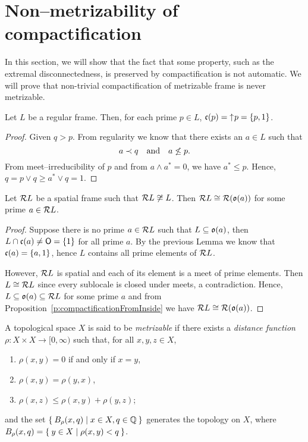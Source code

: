 \section{Non--metrizability of compactification}

In this section, we will show that the fact that some property, such as the extremal disconnectedness, is preserved by compactification is not automatic.
We will prove that non-trivial compactification of metrizable frame is never metrizable.

\begin{lemma}
    Let $L$ be a regular frame. Then, for each prime $p\in L$, $\mathfrak{c}(p) = \mathord{\uparrow}\mkern1mu p = \{p,1\}$.
\end{lemma}
\begin{proof}
    Given $q > p$. From regularity we know that there exists an $a\in L$ such that
    $$ a\prec q\quad\text{and}\quad a\not\leq p. $$
    From meet--irreducibility of $p$ and from $a\wedge a^* = 0$, we have $a^*\leq p$. Hence, $q = p\vee q \geq a^*\vee q = 1$.
\end{proof}

\begin{proposition}\label{p:spatialCompactifAndPrime}
    Let $\mathcal{R} L$ be a spatial frame such that $\mathcal{R} L\not\cong L$. Then $\mathcal{R} L\cong \mathcal{R}(\mathfrak{o}(a))$ for some prime $a\in \mathcal{R} L$.
\end{proposition}
\begin{proof}
    Suppose there is no prime $a\in\mathcal{R} L$ such that $L\subseteq \mathfrak{o}(a)$, then $L\cap \mathfrak{c}(a)\neq \mathsf{O} = \{1\}$ for all prime $a$. By the previous Lemma we know that $\mathfrak{c}(a) = \{a,1\}$, hence $L$ contains all prime elements of $\mathcal{R} L$.

    However, $\mathcal{R} L$ is spatial and each of its element is a meet of prime elements. Then $L\cong \mathcal{R} L$ since every sublocale is closed under meets, a contradiction. Hence, $L\subseteq \mathfrak{o}(a)\subseteq \mathcal{R} L$ for some prime $a$ and from Proposition~\ref{p:compactificationFromInside} we have $\mathcal{R} L\cong \mathcal{R}(\mathfrak{o}(a))$.
\end{proof}

\begin{definition}
    A topological space $X$ is said to be \emph{metrizable} if there exists a \emph{distance function} $\rho\colon X\times X\to [0,\infty)$ such that, for all $x,y,z\in X$,
    \begin{enumerate}[(M1)]
        \item $\rho(x,y) = 0$ if and only if $x = y$,
        \item $\rho(x,y) = \rho(y,x)$,
        \item $\rho(x,z) \leq \rho(x,y) + \rho(y,z)$;
    \end{enumerate}

    \noindent and the set $\Set{ B_\rho(x,q) | x\in X, q\in \mathbb Q}$ generates the topology on $X$, where $B_\rho(x,q) = \Set{ y \in X | \rho(x,y) < q}$.
\end{definition}

